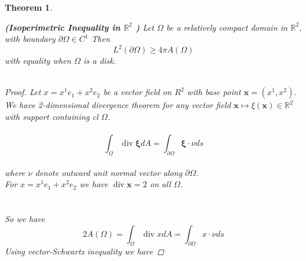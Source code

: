 \documentclass[oneside]{book}
\newtheorem{theorem}{Theorem}[section]
\begin{document}
	\begin{theorem}
		\label{t:2}
		
		\textbf{(Isoperimetric Inequality in $\mathbb{R}^{2}$ )} Let $\Omega$ be a relatively compact domain in $\mathbb{R}^{2}$, with boundary $\partial \Omega \in C^{1}$ Then
		\begin{equation}
		\label{eq14}  
		L^{2}(\partial \Omega) \geq 4 \pi A(\Omega) 
		\end{equation}
		with equality when $\Omega$ is a disk.\\\\
		
		\begin{proof}
			
			Let $x=x^{1} e_{1}+x^{2} e_{2}$ be a vector field on $R^{2}$ with base point $\textbf{x}=\left(x^{1}, x^{2}\right) .$
			We have 2-dimensional divergence theorem for any vector
			field $\textbf{x} \mapsto \xi(\textbf{x}) \in \mathbb{R}^{2}$ with support containing cl $\Omega$.
			\\\\
			\begin{equation}
			\label{eq15}  
			\int_{\Omega} \operatorname{div} \boldsymbol{\xi} d A=\int_{\partial \Omega} \boldsymbol{\xi} \cdot \nu d s 
			\end{equation} \\
			
			where $\nu$ denote outward unit normal vector along $\partial\Omega$. \\
			
			For  $ x=x^{1} e_{1}+x^{2} e_{2}$ we have 
			$\operatorname{div} \textbf{x}=2$ on all $\Omega$. 
			\\\\\\
			So we have
			\\
			$$ 2 A(\Omega)=\int_{\Omega} \operatorname{div} x d A=\int_{\partial \Omega} x \cdot \nu d s$$ 
			Using vector-Schwartz inequality we have 
			

\end{proof}
\end{theorem}
\end{document}
